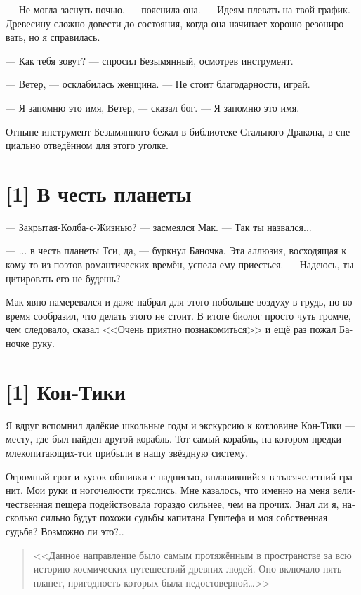 \documentclass[a4paper,12pt,fleqn]{book}\usepackage{cooltooltips}\usepackage{polyglossia}\setdefaultlanguage[babelshorthands=true]{russian}\setotherlanguage{english}\defaultfontfeatures{Ligatures=TeX,Mapping=tex-text} \usepackage{xcolor}\definecolor{lightgray}{HTML}{bbbbbb}\color{lightgray}\newcommand{\ml}[3]{\textenglish{\textcolor{black}{#3}}}
\begin{document}
{--- Не могла заснуть ночью, --- пояснила она.
--- Идеям плевать на твой график.
Древесину сложно довести до состояния, когда она начинает хорошо резонировать, но я справилась.

--- Как тебя зовут? --- спросил Безымянный, осмотрев инструмент.

--- Ветер, --- осклабилась женщина.
--- Не стоит благодарности, играй.

--- Я запомню это имя, Ветер, --- сказал бог.
--- Я запомню это имя.

Отныне инструмент Безымянного бежал в библиотеке Стального Дракона, в специально отведённом для этого уголке.

\section{[1] В честь планеты}

--- Закрытая-Колба-с-Жизнью? --- засмеялся Мак.
--- Так ты назвался...

---  ... в честь планеты Тси, да, --- буркнул Баночка.
Эта аллюзия, восходящая к кому-то из поэтов романтических времён, успела ему приесться.
--- Надеюсь, ты цитировать его не будешь?

Мак явно намеревался и даже набрал для этого побольше воздуху в грудь, но вовремя сообразил, что делать этого не стоит.
В итоге биолог просто чуть громче, чем следовало, сказал <<Очень приятно познакомиться>> и ещё раз пожал Баночке руку.

\section{[1] Кон-Тики}

Я вдруг вспомнил далёкие школьные годы и экскурсию к котловине Кон-Тики --- месту, где был найден другой корабль.
Тот самый корабль, на котором предки млекопитающих-тси прибыли в нашу звёздную систему.

Огромный грот и кусок обшивки с надписью, вплавившийся в тысячелетний гранит.
Мои руки и ногочелюсти тряслись.
Мне казалось, что именно на меня величественная пещера подействовала гораздо сильнее, чем на прочих.
Знал ли я, насколько сильно будут похожи судьбы капитана Гуштефа и моя собственная судьба?
Возможно ли это?..

\begin{quote}
<<Данное направление было самым протяжённым в пространстве за всю историю космических путешествий древних людей.
Оно включало пять планет, пригодность которых была недостоверной\ldots>>
\end{quote}

}
\end{document}
